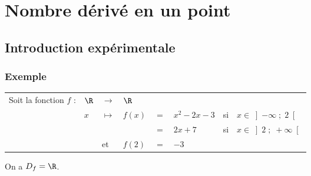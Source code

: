 \ifdefined\COMPLETE
\else
    
    
\fi


\section{Nombre dérivé en un point}

\subsection{Introduction expérimentale}

\subsubsection{Exemple }

\begin{tabular}{llllllll}
Soit la fonction $f$ : & $\R$ & $\longrightarrow$ & $\R$ & & & & \\
& $x$ & $\longmapsto$ & $f\left(x\right)$ & $ = $ & $ x^2 - 2x - 3$ & si & $x \in \left]-\infty \; ; \; 2\right[$ \\
& & & & $=$ & $2x + 7$ &  si & $x \in \left]2 \; ; \; +\infty\right[$ \\
& & et & $f(2)$ & $=$ & $-3$ \\
\end{tabular}

\vspace*{.3cm}

On a $D_f = \R$. \\

